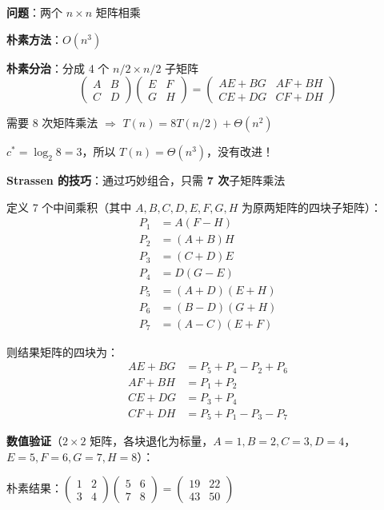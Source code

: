 \documentclass[12pt, a4paper]{ctexart}
\begin{document}
\begin{blackboard}

\textbf{问题}：两个 $n \times n$ 矩阵相乘

\textbf{朴素方法}：$O(n^3)$

\textbf{朴素分治}：分成 4 个 $n/2 \times n/2$ 子矩阵
\[
\begin{pmatrix} A & B \\ C & D \end{pmatrix} \begin{pmatrix} E & F \\ G & H \end{pmatrix} = \begin{pmatrix} AE+BG & AF+BH \\ CE+DG & CF+DH \end{pmatrix}
\]

需要 8 次矩阵乘法 $\Rightarrow$ $T(n) = 8T(n/2) + \Theta(n^2)$

$c^* = \log_2 8 = 3$，所以 $T(n) = \Theta(n^3)$，没有改进！

\textbf{Strassen 的技巧}：通过巧妙组合，只需 \textbf{7 次}子矩阵乘法

定义 7 个中间乘积（其中 $A,B,C,D,E,F,G,H$ 为原两矩阵的四块子矩阵）：
\begin{align*}
P_1 &= A(F - H) \\
P_2 &= (A + B)H \\
P_3 &= (C + D)E \\
P_4 &= D(G - E) \\
P_5 &= (A + D)(E + H) \\
P_6 &= (B - D)(G + H) \\
P_7 &= (A - C)(E + F)
\end{align*}

则结果矩阵的四块为：
\begin{align*}
AE + BG &= P_5 + P_4 - P_2 + P_6 \\
AF + BH &= P_1 + P_2 \\
CE + DG &= P_3 + P_4 \\
CF + DH &= P_5 + P_1 - P_3 - P_7
\end{align*}

\textbf{数值验证}（$2\times 2$ 矩阵，各块退化为标量，$A=1,B=2,C=3,D=4$，$E=5,F=6,G=7,H=8$）：

朴素结果：$\begin{pmatrix}1&2\\3&4\end{pmatrix}\begin{pmatrix}5&6\\7&8\end{pmatrix} = \begin{pmatrix}19&22\\43&50\end{pmatrix}$


\end{blackboard}
\end{document}

